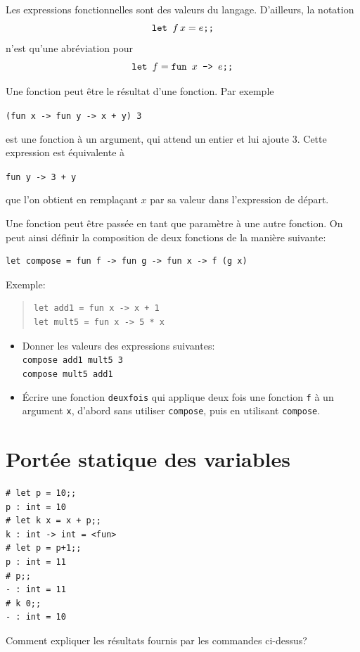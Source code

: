 \documentclass[11pt, a4paper]{article}
\begin{document}
Les expressions fonctionnelles sont des valeurs du
langage. D'ailleurs, la notation
$$\mbox{\tt let\ } f \, x = e\verb+;;+$$
n'est qu'une abréviation pour
$$\mbox{\tt let\ } f = \mbox{\tt fun\ } x \mbox{\tt\ ->\ } e\verb+;;+$$

\noindent Une fonction peut être le résultat d'une fonction. Par
exemple\\
\centerline{\texttt{(fun x -> fun y -> x + y) 3}}
est une fonction à un argument, qui attend un entier et lui ajoute
$3$. Cette expression est équivalente à\\
\centerline{\texttt{fun y -> 3 + y}}
que l'on obtient en remplaçant $x$ par sa valeur dans l'expression de
départ.

Une fonction peut être passée en tant que paramètre à une autre
fonction. On peut ainsi définir la composition de deux fonctions de la
manière suivante:

\begin{verbatim}
let compose = fun f -> fun g -> fun x -> f (g x)
\end{verbatim}

\noindent Exemple:
\begin{quote}
\begin{verbatim}
let add1 = fun x -> x + 1
let mult5 = fun x -> 5 * x
\end{verbatim}
\end{quote}

\begin{itemize}
\item Donner les valeurs des expressions suivantes: \\
\verb|compose add1 mult5 3|\\
\verb|compose mult5 add1|
\item Écrire une fonction \verb|deuxfois| qui applique deux fois une fonction \verb|f| à un argument \verb|x|,
d'abord sans utiliser \verb|compose|, puis en utilisant
\verb|compose|.
\end{itemize}

\section{Portée statique des variables}

\begin{verbatim}
# let p = 10;;
p : int = 10
# let k x = x + p;;
k : int -> int = <fun>
# let p = p+1;;
p : int = 11
# p;;
- : int = 11
# k 0;;
- : int = 10
\end{verbatim}

Comment expliquer les résultats fournis par les commandes ci-dessus?
\end{document}
